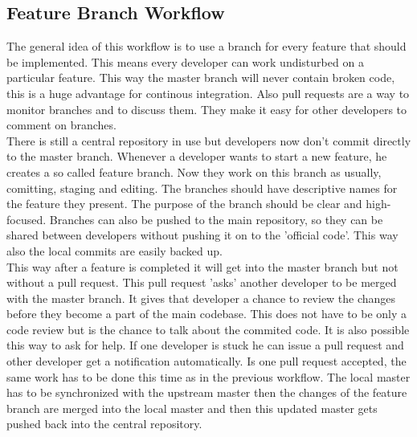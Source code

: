 \subsection{Feature Branch Workflow}
The general idea of this workflow is to use a branch for every feature that should be implemented. This means every developer can work undisturbed on a particular feature.
This way the master branch will never contain broken code, this is a huge advantage for continous integration.
Also pull requests are a way to monitor branches and to discuss them. They make it easy for other developers to comment on branches.
\\
There is still a central repository in use but developers now don't commit directly to the master branch. Whenever a developer wants to start a new feature, he creates a so called feature branch.
Now they work on this branch as usually, comitting, staging and editing. The branches should have descriptive names for the feature they present. 
The purpose of the branch should be clear and  high-focused. Branches can also be pushed to the main repository, so they can be shared between developers 
without pushing it on to the 'official code'. This way also the local commits are easily backed  up.
\\
This way after a feature is completed it will get into the master branch but not without a pull request. This pull request 'asks' another developer to be merged with the master branch.
It gives that developer a chance to review the changes before they become a part of the main codebase. This does not have to be only a code review but is the chance to talk about 
the commited code. It is also possible this way to ask for help. If one developer is stuck he can issue a pull request and other developer get a notification automatically.
Is one pull request accepted, the same work has to be done this time as in the previous workflow. The local master has to be synchronized with the upstream master then the changes 
of the feature branch are merged into the local master and then this updated master gets pushed back into the central repository.

